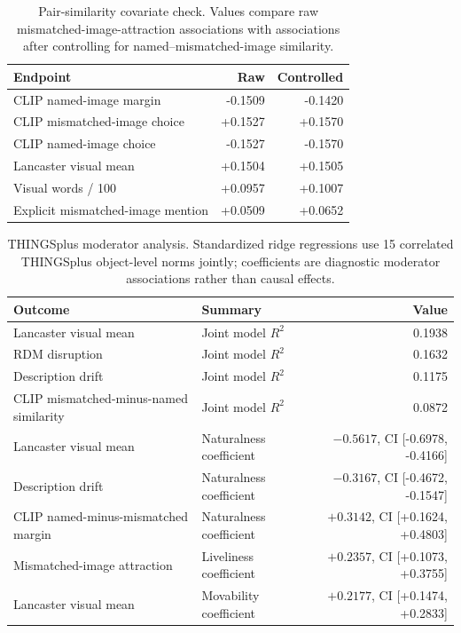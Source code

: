 \documentclass{article}
\begin{document}
\begin{table}[!htbp]
\centering
\caption{Pair-similarity covariate check. Values compare raw mismatched-image-attraction associations with associations after controlling for named--mismatched-image similarity.}
\label{tab:pair_similarity_covariate}
\small
\begin{tabular}{lrr}
\toprule
Endpoint & Raw & Controlled \\
\midrule
CLIP named-image margin & -0.1509 & -0.1420 \\
CLIP mismatched-image choice & +0.1527 & +0.1570 \\
CLIP named-image choice & -0.1527 & -0.1570 \\
Lancaster visual mean & +0.1504 & +0.1505 \\
Visual words / 100 & +0.0957 & +0.1007 \\
Explicit mismatched-image mention & +0.0509 & +0.0652 \\
\bottomrule
\end{tabular}
\end{table}

\begin{table}[!htbp]
\centering
\caption{THINGSplus moderator analysis. Standardized ridge regressions use 15 correlated THINGSplus object-level norms jointly; coefficients are diagnostic moderator associations rather than causal effects.}
\label{tab:thingsplus_moderators}
\footnotesize
\begin{tabular}{llr}
\toprule
Outcome & Summary & Value \\
\midrule
Lancaster visual mean & Joint model \(R^2\) & 0.1938 \\
RDM disruption & Joint model \(R^2\) & 0.1632 \\
Description drift & Joint model \(R^2\) & 0.1175 \\
CLIP mismatched-minus-named similarity & Joint model \(R^2\) & 0.0872 \\
\midrule
Lancaster visual mean & Naturalness coefficient & \(-0.5617\), CI [-0.6978, -0.4166] \\
Description drift & Naturalness coefficient & \(-0.3167\), CI [-0.4672, -0.1547] \\
CLIP named-minus-mismatched margin & Naturalness coefficient & \(+0.3142\), CI [+0.1624, +0.4803] \\
Mismatched-image attraction & Liveliness coefficient & \(+0.2357\), CI [+0.1073, +0.3755] \\
Lancaster visual mean & Movability coefficient & \(+0.2177\), CI [+0.1474, +0.2833] \\
\bottomrule
\end{tabular}
\end{table}
\end{document}
